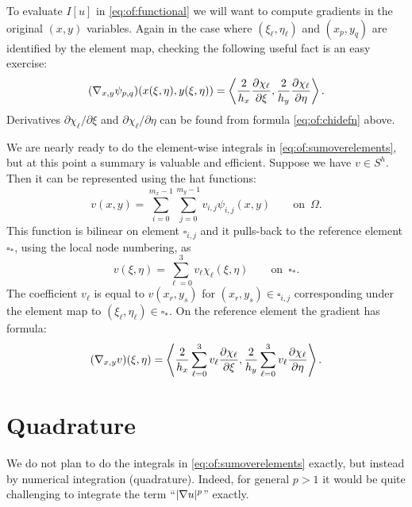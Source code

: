 To evaluate $I[u]$ in \eqref{eq:of:functional} we will want to compute gradients in the original $(x,y)$ variables.  Again in the case where $(\xi_\ell,\eta_\ell)$ and $(x_p,y_q)$ are identified by the element map, checking the following useful fact is an easy exercise:
\begin{equation}
  (\nabla_{x,y} \psi_{p,q})(x(\xi,\eta),y(\xi,\eta)) = \left<\frac{2}{h_x}\frac{\partial\chi_\ell}{\partial \xi},\frac{2}{h_y}\frac{\partial\chi_\ell}{\partial \eta}\right>.   \label{eq:of:gradphionref}
\end{equation}
Derivatives $\partial\chi_\ell/\partial \xi$ and $\partial\chi_\ell/\partial \eta$ can be found from formula \eqref{eq:of:chidefn} above.

We are nearly ready to do the element-wise integrals in \eqref{eq:of:sumoverelements}, but at this point a summary is valuable and efficient.  Suppose we have $v \in S^h$.  Then it can be represented using the hat functions:
\begin{equation}
v(x,y) = \sum_{i=0}^{m_x-1} \sum_{j=0}^{m_y-1} v_{i,j} \psi_{i,j}(x,y)  \qquad \text{on } \,\Omega. \label{eq:of:bilinearrepresentation}
\end{equation}
This function is bilinear on element $\square_{i,j}$ and it pulls-back to the reference element $\square_\ast$, using the local node numbering, as
\begin{equation}
v(\xi,\eta) = \sum_{\ell=0}^3 v_\ell \chi_\ell(\xi,\eta)  \qquad \text{on } \,\square_\ast. \label{eq:of:bilinearref}
\end{equation}
The coefficient $v_\ell$ is equal to $v(x_r,y_s)$ for $(x_r,y_s)\in\square_{i,j}$ corresponding under the element map to $(\xi_\ell,\eta_\ell) \in \square_\ast$.  On the reference element the gradient has formula:
\begin{equation}
  (\nabla_{x,y} v)(\xi,\eta) = \left<\frac{2}{h_x} \sum_{\ell=0}^3 v_\ell \frac{\partial\chi_\ell}{\partial \xi}, \frac{2}{h_y} \sum_{\ell=0}^3 v_\ell \frac{\partial\chi_\ell}{\partial \eta}\right>. \label{eq:of:gradrepref}
\end{equation}


\section{Quadrature}

We do not plan to do the integrals in \eqref{eq:of:sumoverelements} exactly, but instead by numerical integration (quadrature).  Indeed, for general $p>1$ it would be quite challenging to integrate the term ``$|\nabla u|^p$'' exactly.

